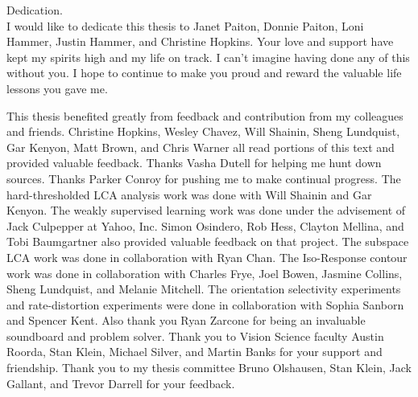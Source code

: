 \documentclass{ucbthesis}
\begin{document}
\begin{frontmatter}


\begin{dedication}
\null\vfil
\begin{center}
Dedication.\\\vspace{12pt}
I would like to dedicate this thesis to Janet Paiton, Donnie Paiton, Loni Hammer, Justin Hammer, and Christine Hopkins. Your love and support have kept my spirits high and my life on track. I can't imagine having done any of this without you. I hope to continue to make you proud and reward the valuable life lessons you gave me.
\end{center}
\vfil\null
\end{dedication}


\tableofcontents
\clearpage
\listoffigures
\listoftables

\begin{acknowledgements}
This thesis benefited greatly from feedback and contribution from my colleagues and friends. Christine Hopkins, Wesley Chavez, Will Shainin, Sheng Lundquist, Gar Kenyon, Matt Brown, and Chris Warner all read portions of this text and provided valuable feedback. Thanks Vasha Dutell for helping me hunt down sources. Thanks Parker Conroy for pushing me to make continual progress. The hard-thresholded LCA analysis work was done with Will Shainin and Gar Kenyon. The weakly supervised learning work was done under the advisement of Jack Culpepper at Yahoo, Inc. Simon Osindero, Rob Hess, Clayton Mellina, and Tobi Baumgartner also provided valuable feedback on that project. The subspace LCA work was done in collaboration with Ryan Chan. The Iso-Response contour work was done in collaboration with Charles Frye, Joel Bowen, Jasmine Collins, Sheng Lundquist, and Melanie Mitchell. The orientation selectivity experiments and rate-distortion experiments were done in collaboration with Sophia Sanborn and Spencer Kent. Also thank you Ryan Zarcone for being an invaluable soundboard and problem solver. Thank you to Vision Science faculty Austin Roorda, Stan Klein, Michael Silver, and Martin Banks for your support and friendship. Thank you to my thesis committee Bruno Olshausen, Stan Klein, Jack Gallant, and Trevor Darrell for your feedback.


\end{acknowledgements}
\end{frontmatter}
\end{document}
